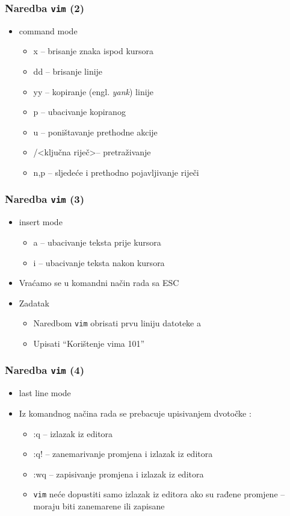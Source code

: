 \documentclass{beamer}
\newcommand{\shell}[1]{\texttt{#1}}
\begin{document}
\begin{frame}[t]
\frametitle{Naredba \shell{vim} (2)}
\begin{itemize}
  \item command mode
  \begin{itemize}
    \item x -- brisanje znaka ispod kursora
    \item dd -- brisanje linije
    \item yy -- kopiranje (engl. \emph{yank}) linije
    \item p --  ubacivanje kopiranog
    \item u -- poništavanje prethodne akcije
    \item /\textless ključna riječ\textgreater -- pretraživanje
    \item n,p -- sljedeće i prethodno pojavljivanje riječi
  \end{itemize}
\end{itemize}
\end{frame}

\begin{frame}[t]
\frametitle{Naredba \shell{vim} (3)}
\begin{itemize}
  \item insert mode
  \begin{itemize}
    \item a -- ubacivanje teksta prije kursora
    \item i -- ubacivanje teksta nakon kursora
  \end{itemize}
  \item Vraćamo se u komandni način rada sa ESC
  \item Zadatak
  \begin{itemize}
    \item Naredbom \shell{vim} obrisati prvu liniju datoteke a
    \item Upisati ``Korištenje vima 101''
  \end{itemize}
\end{itemize}
\end{frame}

\begin{frame}[t]
\frametitle{Naredba \shell{vim} (4)}
\begin{itemize}
  \item last line mode
  \item Iz komandnog načina rada se prebacuje upisivanjem dvotočke :
  \begin{itemize}
    \item[] :q -- izlazak iz editora
    \item[] :q! -- zanemarivanje promjena i izlazak iz editora
    \item[] :wq -- zapisivanje promjena i izlazak iz editora
    \item \shell{vim} neće dopustiti samo izlazak iz editora ako su rađene 
          promjene -- moraju biti zanemarene ili zapisane
  \end{itemize}
\end{itemize}
\end{frame}
\end{document}
